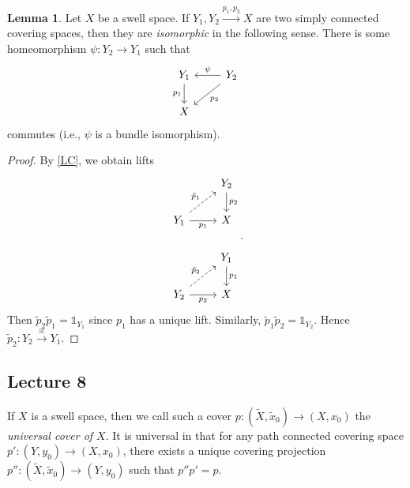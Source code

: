 \documentclass[10pt,letterpaper,cm]{nupset}
\theoremstyle{definition}
\theoremstyle{theorem}
\newtheorem{lemma}[definition]{Lemma}
\theoremstyle{remark}
\newcommand{\1}{\mathbb{1}}
\newcommand{\0}{\vec 0}
\begin{document}
\begin{lemma}
Let $X$ be a swell space.  If $Y_1, Y_2 \xrightarrow{p_1, p_2} X$ are two simply connected covering spaces, then they are \textit{isomorphic} in the following sense. There is some homeomorphism $\psi : Y_2 \to Y_1$ such that 
\[
\begin{tikzcd}
Y_1 \arrow[d, "p_1"'] & Y_2 \arrow[ld, "p_2"] \arrow[l, "\psi"'] \\
X & 
\end{tikzcd}
\] commutes (i.e., $\psi$ is a bundle isomorphism).
\end{lemma}
\begin{proof}
By \cref{LC}, we obtain lifts
\[
\begin{tikzcd}
 & Y_2 \arrow[d, "p_2"] \\
Y_1 \arrow[r, "p_1"'] \arrow[ru, "\tilde{p}_1", dashed] & X \\
 & Y_1 \arrow[d, "p_1"] \\
Y_2 \arrow[r, "p_2"'] \arrow[ru, "\tilde{p}_2", dashed] & X
\end{tikzcd}.
\] Then $\tilde{p}_2\tilde{p}_1 = \1_{Y_1}$ since $p_1$ has a unique lift. Similarly, $\tilde{p}_1\tilde{p}_2 = \1_{Y_2}$. Hence $\tilde{p}_2 : Y_2 \overset{\cong}{\longrightarrow} Y_1.$ 
\end{proof}

\subsection{Lecture 8}


If $X$ is a swell space, then we call such a cover $p: \left(\widetilde{X}, \tilde{x}_0\right) \to \left(X, x_0\right)$ the \textit{universal cover of $X$}. It is universal in that for any path connected covering space $p': \left(Y, y_0\right) \to \left(X, x_0\right)$, there exists a unique covering projection $p'': \left(\widetilde{X}, \tilde{x}_0\right) \to \left(Y, y_0\right)$ such that $p'' p' = p$. 
\end{document}
